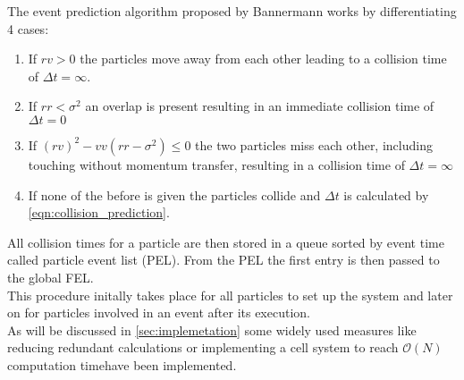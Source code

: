 
The event prediction algorithm proposed by Bannermann\cite{Bannerman2014} works by differentiating 4 cases:
\begin{enumerate}
\item If $rv>0$ the particles move away from each other leading to a collision time of $\Delta t = \infty$.
\item If $rr<\sigma^2$ an overlap is present resulting in an immediate collision time of $\Delta t = 0$
\item If $(rv)^2  - vv (rr - \sigma^2 ) \leq 0 $ the two particles miss each other, including touching without momentum transfer, resulting in a collision time of $\Delta t = \infty$
\item If none of the before is given the particles collide and $\Delta t$ is calculated by \autoref{eqn:collision_prediction}.
\end{enumerate}

All collision times for a particle are then stored in a queue sorted by event time called particle event list (PEL). From the PEL the first entry is then passed to the global FEL.\\
This procedure initally takes place for all particles to set up the system and later on for particles involved in an event after its execution.\\ 

As will be discussed in \autoref{sec:implemetation} some widely used measures like reducing redundant calculations or implementing a cell system to reach $\mathcal{O}(N)$ computation timehave been implemented.\\

